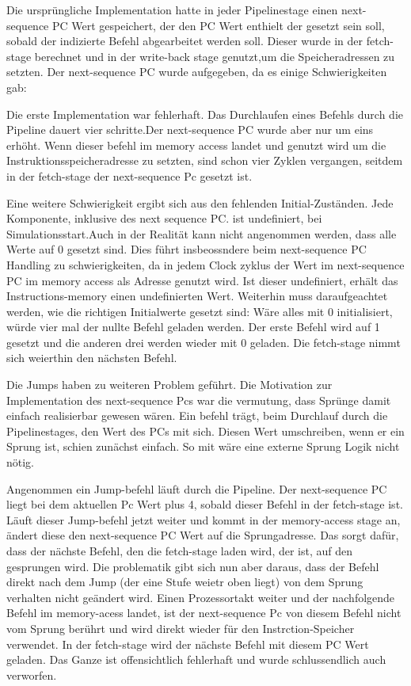 \documentclass[paper=a4,fontsize=12pt,twocolumn]{scrreprt}
\begin{document}
Die ursprüngliche Implementation hatte in jeder Pipelinestage einen next-sequence PC Wert gespeichert, der den PC Wert enthielt der gesetzt sein soll, sobald der indizierte Befehl abgearbeitet werden soll. Dieser wurde in der fetch-stage berechnet und in der write-back stage genutzt,um die Speicheradressen zu setzten. 
Der next-sequence PC wurde aufgegeben, da es einige Schwierigkeiten gab:

Die erste Implementation war fehlerhaft. Das Durchlaufen eines Befehls durch die Pipeline dauert vier schritte.Der next-sequence PC wurde aber nur um eins erhöht. Wenn dieser befehl im memory access landet und genutzt wird um die Instruktionsspeicheradresse zu setzten, sind schon vier Zyklen vergangen, seitdem in der fetch-stage der next-sequence Pc gesetzt ist. 

Eine weitere Schwierigkeit ergibt sich aus den fehlenden Initial-Zuständen.
Jede Komponente, inklusive des next sequence PC. ist undefiniert, bei Simulationsstart.Auch in der Realität kann nicht angenommen werden, dass alle Werte auf 0 gesetzt sind. Dies führt insbeossndere beim next-sequence PC Handling zu schwierigkeiten, da in jedem Clock zyklus der Wert im next-sequence PC im memory access als Adresse genutzt wird. Ist dieser undefiniert, erhält das Instructions-memory einen undefinierten Wert. Weiterhin muss daraufgeachtet werden, wie die richtigen Initialwerte gesetzt sind: Wäre alles mit 0 initialisiert, würde vier mal der nullte Befehl geladen werden. Der erste Befehl wird auf 1 gesetzt und die anderen drei werden wieder mit 0 geladen. Die fetch-stage nimmt sich weierthin den nächsten Befehl.


Die Jumps haben zu weiteren Problem geführt.
Die Motivation zur Implementation des next-sequence Pcs war die vermutung, dass Sprünge damit einfach realisierbar gewesen wären. Ein befehl trägt, beim Durchlauf durch die Pipelinestages, den Wert des PCs mit sich. Diesen Wert umschreiben, wenn er ein Sprung ist, schien zunächst einfach. So mit wäre eine externe Sprung Logik nicht nötig. 

Angenommen ein Jump-befehl läuft durch die  Pipeline. Der next-sequence PC liegt bei dem aktuellen Pc Wert plus 4, sobald dieser Befehl in der fetch-stage ist. Läuft dieser Jump-befehl jetzt weiter und kommt in der memory-access stage an, ändert diese den next-sequence PC Wert auf die Sprungadresse. Das sorgt dafür, dass der nächste Befehl, den die fetch-stage laden wird, der ist, auf den gesprungen wird. Die problematik gibt sich nun aber daraus, dass der Befehl direkt nach dem Jump (der eine Stufe weietr oben liegt) von dem Sprung verhalten nicht geändert wird. Einen Prozessortakt weiter und der nachfolgende Befehl im memory-acess landet, ist der next-sequence Pc von diesem Befehl nicht vom Sprung berührt und wird direkt wieder für den Instrction-Speicher verwendet. In der fetch-stage wird der nächste Befehl mit diesem PC Wert geladen. 
Das Ganze ist offensichtlich fehlerhaft und wurde schlussendlich auch verworfen.
\end{document}

